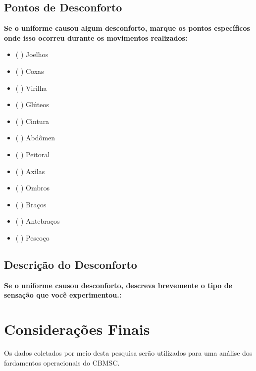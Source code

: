 \subsection{Pontos de Desconforto}
\textbf{Se o uniforme causou algum desconforto, marque os pontos específicos onde isso ocorreu durante os movimentos realizados:}
\begin{itemize}
    \item ( ) Joelhos
    \item ( ) Coxas
    \item ( ) Virilha
    \item ( ) Glúteos
    \item ( ) Cintura
    \item ( ) Abdômen
    \item ( ) Peitoral
    \item ( ) Axilas
    \item ( ) Ombros
    \item ( ) Braços
    \item ( ) Antebraços
    \item ( ) Pescoço
\end{itemize}

\subsection{Descrição do Desconforto}
\textbf{Se o uniforme causou desconforto, descreva brevemente o tipo de sensação que você experimentou.:}
\vspace{2cm}

\section{Considerações Finais}
Os dados coletados por meio desta pesquisa serão utilizados para uma análise dos fardamentos operacionais do CBMSC.